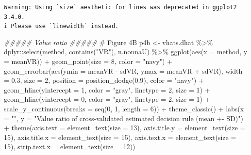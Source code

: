 \documentclass[
  letterpaper,
  DIV=11,
  numbers=noendperiod]{scrreprt}
\newenvironment{Shaded}{\begin{snugshade}}{\end{snugshade}}
\newcommand{\AttributeTok}[1]{\textcolor[rgb]{0.40,0.45,0.13}{#1}}
\newcommand{\CommentTok}[1]{\textcolor[rgb]{0.37,0.37,0.37}{#1}}
\newcommand{\DecValTok}[1]{\textcolor[rgb]{0.68,0.00,0.00}{#1}}
\newcommand{\DocumentationTok}[1]{\textcolor[rgb]{0.37,0.37,0.37}{\textit{#1}}}
\newcommand{\FloatTok}[1]{\textcolor[rgb]{0.68,0.00,0.00}{#1}}
\newcommand{\FunctionTok}[1]{\textcolor[rgb]{0.28,0.35,0.67}{#1}}
\newcommand{\NormalTok}[1]{\textcolor[rgb]{0.00,0.23,0.31}{#1}}
\newcommand{\OtherTok}[1]{\textcolor[rgb]{0.00,0.23,0.31}{#1}}
\newcommand{\SpecialCharTok}[1]{\textcolor[rgb]{0.37,0.37,0.37}{#1}}
\newcommand{\StringTok}[1]{\textcolor[rgb]{0.13,0.47,0.30}{#1}}
\begin{document}
\begin{verbatim}
Warning: Using `size` aesthetic for lines was deprecated in ggplot2 3.4.0.
i Please use `linewidth` instead.
\end{verbatim}

\begin{Shaded}
\begin{Highlighting}[]
\DocumentationTok{\#\#\#\#\# Value ratio \#\#\#\#\#}
\CommentTok{\# Figure 4B}
\NormalTok{p4b }\OtherTok{\textless{}{-}}\NormalTok{ vhats.dhat }\SpecialCharTok{\%\textgreater{}\%}
\NormalTok{  dplyr}\SpecialCharTok{::}\FunctionTok{select}\NormalTok{(method, }\FunctionTok{contains}\NormalTok{(}\StringTok{"VR"}\NormalTok{), n.nonnaU) }\SpecialCharTok{\%\textgreater{}\%}
  \FunctionTok{ggplot}\NormalTok{(}\FunctionTok{aes}\NormalTok{(}\AttributeTok{x =}\NormalTok{ method, }\AttributeTok{y =}\NormalTok{ meanVR)) }\SpecialCharTok{+}
  \FunctionTok{geom\_point}\NormalTok{(}\AttributeTok{size =} \DecValTok{8}\NormalTok{, }\AttributeTok{color =} \StringTok{"navy"}\NormalTok{) }\SpecialCharTok{+}
  \FunctionTok{geom\_errorbar}\NormalTok{(}\FunctionTok{aes}\NormalTok{(}\AttributeTok{ymin =}\NormalTok{ meanVR }\SpecialCharTok{{-}}\NormalTok{ sdVR, }\AttributeTok{ymax =}\NormalTok{ meanVR }\SpecialCharTok{+}\NormalTok{ sdVR), }\AttributeTok{width =} \FloatTok{0.3}\NormalTok{, }\AttributeTok{size =} \DecValTok{2}\NormalTok{, }\AttributeTok{position =} \FunctionTok{position\_dodge}\NormalTok{(}\FloatTok{0.9}\NormalTok{), }\AttributeTok{color =} \StringTok{"navy"}\NormalTok{) }\SpecialCharTok{+}
  \FunctionTok{geom\_hline}\NormalTok{(}\AttributeTok{yintercept =} \DecValTok{1}\NormalTok{, }\AttributeTok{color =} \StringTok{"gray"}\NormalTok{, }\AttributeTok{linetype =} \DecValTok{2}\NormalTok{, }\AttributeTok{size =} \DecValTok{1}\NormalTok{) }\SpecialCharTok{+}
  \FunctionTok{geom\_hline}\NormalTok{(}\AttributeTok{yintercept =} \DecValTok{0}\NormalTok{, }\AttributeTok{color =} \StringTok{"gray"}\NormalTok{, }\AttributeTok{linetype =} \DecValTok{2}\NormalTok{, }\AttributeTok{size =} \DecValTok{1}\NormalTok{) }\SpecialCharTok{+}
  \FunctionTok{scale\_y\_continuous}\NormalTok{(}\AttributeTok{breaks =} \FunctionTok{seq}\NormalTok{(}\DecValTok{0}\NormalTok{, }\DecValTok{1}\NormalTok{, }\AttributeTok{length =} \DecValTok{6}\NormalTok{)) }\SpecialCharTok{+}
  \FunctionTok{theme\_classic}\NormalTok{() }\SpecialCharTok{+}
  \FunctionTok{labs}\NormalTok{(}\AttributeTok{x =} \StringTok{""}\NormalTok{, }\AttributeTok{y =} \StringTok{"Value ratio of cross{-}validated estimated decision rule (mean +{-} SD)"}\NormalTok{) }\SpecialCharTok{+}
  \FunctionTok{theme}\NormalTok{(}\AttributeTok{axis.text =} \FunctionTok{element\_text}\NormalTok{(}\AttributeTok{size =} \DecValTok{13}\NormalTok{),}
        \AttributeTok{axis.title.y =} \FunctionTok{element\_text}\NormalTok{(}\AttributeTok{size =} \DecValTok{15}\NormalTok{),}
        \AttributeTok{axis.title.x =} \FunctionTok{element\_text}\NormalTok{(}\AttributeTok{size =} \DecValTok{15}\NormalTok{),}
        \AttributeTok{axis.text.x =} \FunctionTok{element\_text}\NormalTok{(}\AttributeTok{size =} \DecValTok{15}\NormalTok{),}
        \AttributeTok{strip.text.x =} \FunctionTok{element\_text}\NormalTok{(}\AttributeTok{size =} \DecValTok{12}\NormalTok{))}


\end{Highlighting}
\end{Shaded}
\end{document}
